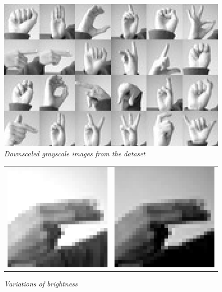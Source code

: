 \documentclass[a4paper]{article}
\begin{document}
\begin{figure}
     \centering
     \includegraphics[width=1\linewidth]{graphics/dataset/amer_sign3.png}
     \caption{\textit{Downscaled grayscale images from the dataset \cite{DatasetKaggle}}}
     \label{fig:full_grayscale}
\end{figure}


\begin{figure}
     \centering
     \begin{tabular}{cc}
          \includegraphics[width=.35\linewidth]{graphics/dataset/bright.png}&\includegraphics[width=.35\linewidth]{graphics/dataset/dark.png}
     \end{tabular}
     \caption{\textit{Variations of brightness}}
     \label{fig:brightness}
\end{figure}
\end{document}
